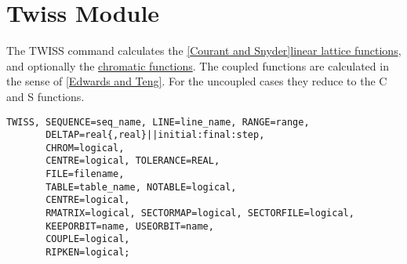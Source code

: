 

\chapter{Twiss Module}

The TWISS command calculates the
\href{../Introduction/bibliography.html#courant}{[Courant and
    Snyder]}\href{../Introduction/tables.html#linear}{linear lattice
  functions}, and optionally the
\href{../Introduction/tables.html#chrom}{chromatic functions}. 
The coupled functions are calculated in the sense of
\href{../Introduction/bibliography.html#edwards}{[Edwards and Teng]}. 
For the uncoupled cases they reduce to the C and S functions. 

\begin{verbatim}
TWISS, SEQUENCE=seq_name, LINE=line_name, RANGE=range, 
       DELTAP=real{,real}||initial:final:step,
       CHROM=logical,
       CENTRE=logical, TOLERANCE=REAL,
       FILE=filename,
       TABLE=table_name, NOTABLE=logical,
       CENTRE=logical,
       RMATRIX=logical, SECTORMAP=logical, SECTORFILE=logical,
       KEEPORBIT=name, USEORBIT=name,
       COUPLE=logical,
       RIPKEN=logical;
\end{verbatim}

